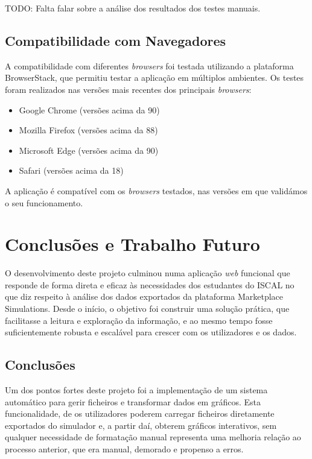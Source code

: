 TODO: Falta falar sobre a análise dos resultados dos testes manuais.

\section{Compatibilidade com Navegadores}

A compatibilidade com diferentes \textit{browsers} foi testada utilizando a plataforma BrowserStack, que permitiu testar a aplicação em múltiplos ambientes. Os testes foram realizados nas versões mais recentes dos principais \textit{browsers}:

\begin{itemize}
    \item Google Chrome (versões acima da 90)
    \item Mozilla Firefox (versões acima da 88)
    \item Microsoft Edge (versões acima da 90)
    \item Safari (versões acima da 18)
\end{itemize}

A aplicação é compatível com os \textit{browsers} testados, nas versões em que validámos o seu funcionamento.

\chapter{Conclusões e Trabalho Futuro}
\label{ch:conclusoesTrabalhoFuturo}

O desenvolvimento deste projeto culminou numa aplicação \textit{web} funcional que responde de forma direta e eficaz às necessidades dos estudantes do ISCAL no que diz respeito à análise dos dados exportados da plataforma Marketplace Simulations. Desde o início, o objetivo foi construir uma solução prática, que facilitasse a leitura e exploração da informação, e ao mesmo tempo fosse suficientemente robusta e escalável para crescer com os utilizadores e os dados.

\section{Conclusões}

Um dos pontos fortes deste projeto foi a implementação de um sistema automático para gerir ficheiros e transformar dados em gráficos. Esta funcionalidade, de os utilizadores poderem carregar ficheiros diretamente exportados do simulador e, a partir daí, obterem gráficos interativos, sem qualquer necessidade de formatação manual representa uma melhoria relação ao processo anterior, que era manual, demorado e propenso a erros. 

